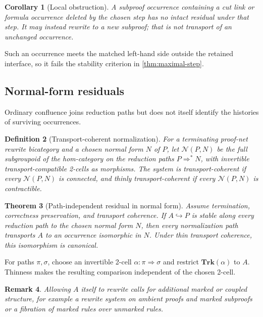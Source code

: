 \documentclass[12pt,a4paper,twoside]{extarticle}
\makeatletter
\theoremstyle{compactplain}
\newtheorem{theorem}{Theorem}[section]
\newtheorem{corollary}[theorem]{Corollary}
\theoremstyle{compactdef}
\newtheorem{definition}[theorem]{Definition}
\newtheorem{remark}[theorem]{Remark}
\renewenvironment{proof}[1][\proofname]{\par\pushQED{\qed}\normalfont
  \topsep2pt\trivlist\item[\hskip\labelsep\bfseries #1\@addpunct{.}]\ignorespaces}
 {\popQED\endtrivlist\@endpefalse}
\newcommand{\mono}{\hookrightarrow}
\makeatother
\begin{document}
\begin{corollary}[Local obstruction]
A subproof occurrence containing a cut link or formula occurrence deleted by the chosen step has no intact residual under that step. It may instead rewrite to a new subproof; that is not transport of an unchanged occurrence.
\end{corollary}
\begin{proof}
Such an occurrence meets the matched left-hand side outside the retained interface, so it fails the stability criterion in \cref{thm:maximal-step}.
\end{proof}

\subsection{Normal-form residuals}
Ordinary confluence joins reduction paths but does not itself identify the histories of surviving occurrences.

\begin{definition}[Transport-coherent normalization]
For a terminating proof-net rewrite bicategory and a chosen normal form $N$ of $P$, let $\mathcal N(P,N)$ be the full subgroupoid of the hom-category on the reduction paths $P\Rightarrow^*N$, with invertible transport-compatible 2-cells as morphisms. The system is \emph{transport-coherent} if every $\mathcal N(P,N)$ is connected, and \emph{thinly transport-coherent} if every $\mathcal N(P,N)$ is contractible.
\end{definition}

\begin{theorem}[Path-independent residual in normal form]
Assume termination, correctness preservation, and transport coherence. If $A\mono P$ is stable along every reduction path to the chosen normal form $N$, then every normalization path transports $A$ to an occurrence isomorphic in $N$. Under thin transport coherence, this isomorphism is canonical.
\end{theorem}
\begin{proof}
For paths $\pi,\sigma$, choose an invertible 2-cell $\alpha:\pi\Rightarrow\sigma$ and restrict $\mathbf{Trk}(\alpha)$ to $A$. Thinness makes the resulting comparison independent of the chosen 2-cell.
\end{proof}

\begin{remark}
Allowing $A$ itself to rewrite calls for additional marked or coupled structure, for example a rewrite system on ambient proofs and marked subproofs or a fibration of marked rules over unmarked rules.
\end{remark}
\end{document}
